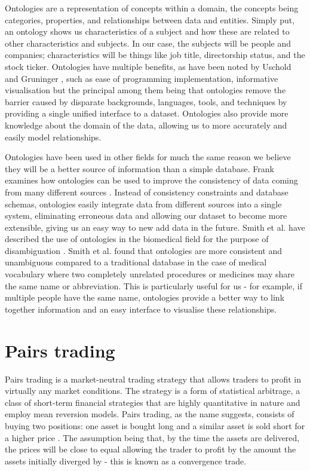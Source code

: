 \documentclass{UoYCSproject}
\begin{document}
Ontologies are a representation of concepts within a domain, the concepts being categories, properties, and relationships between data and entities. Simply put, an ontology shows us characteristics of a subject and how these are related to other characteristics and subjects. In our case, the subjects will be people and companies; characteristics will be things like job title, directorship status, and the stock ticker. Ontologies have multiple benefits, as have been noted by Uschold and Gruninger \parencite{ontdef}, such as ease of programming implementation, informative visualisation but the principal among them being that ontologies remove the barrier caused by disparate backgrounds, languages, tools, and techniques by providing a single unified interface to a dataset. Ontologies also provide more knowledge about the domain of the data, allowing us to more accurately and easily model relationships.

Ontologies have been used in other fields for much the same reason we believe they will be a better source of information than a simple database. Frank examines how ontologies can be used to improve the consistency of data coming from many different sources \parencite{ontgeog}. Instead of consistency constraints and database schemas, ontologies easily integrate data from different sources into a single system, eliminating erroneous data and allowing our dataset to become more extensible, giving us an easy way to new add data in the future. Smith et al. have described the use of ontologies in the biomedical field for the purpose of disambiguation \parencite{ontbio}. Smith et al. found that ontologies are more consistent and unambiguous compared to a traditional database in the case of medical vocabulary where two completely unrelated procedures or medicines may share the same name or abbreviation. This is particularly useful for us - for example, if multiple people have the same name, ontologies provide a better way to link together information and an easy interface to visualise these relationships.

\section{Pairs trading}

Pairs trading is a market-neutral trading strategy that allows traders to profit in virtually any market conditions. The strategy is a form of statistical arbitrage, a class of short-term financial strategies that are highly quantitative in nature and employ mean reversion models. Pairs trading, as the name suggests, consists of buying two positions: one asset is bought long and a similar asset is sold short for a higher price \parencite{pairsdesc}. The assumption being that, by the time the assets are delivered, the prices will be close to equal allowing the trader to profit by the amount the assets initially diverged by - this is known as a convergence trade.
\end{document}
